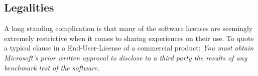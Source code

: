 \documentclass{cidr-2019}
\begin{document}
\subsection{Legalities\label{legalities}}






A long standing complication is that many of the software licenses are seemingly extremely restrictive when it comes to sharing experiences on their use. To quote a typical clause in a End-User-License of a commercial product:
\emph{ You must obtain Microsoft's prior written approval to disclose to a third party the results of any benchmark test of the software.}
\end{document}
